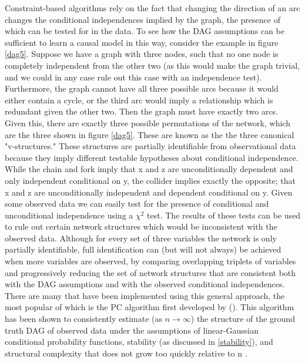 \documentclass{article}
\begin{document}
Constraint-based algorithms rely on the fact that changing the direction of an arc changes the conditional independences implied by the graph, the presence of which can be tested for in the data. To see how the DAG assumptions can be sufficient to learn a causal model in this way, consider the example in figure \ref{dag5}. Suppose we have a graph with three nodes, such that no one node is completely independent from the other two (as this would make the graph trivial, and we could in any case rule out this case with an independence test). Furthermore, the graph cannot have all three possible arcs because it would either contain a cycle, or the third arc would imply a relationship which is redundant given the other two. Then the graph must have exactly two arcs. Given this, there are exactly three possible permutations of the network, which are the three shown in figure \ref{dag5}. These are known as the the three canonical "v-structures." \parencite{pearl2014probabilistic} These structures are partially identifiable from observational data because they imply different testable hypotheses about conditional independence. While the chain and fork imply that x and z are unconditionally dependent and only independent conditional on y, the collider implies exactly the opposite; that x and z are unconditionally independent and dependent conditional on y. Given some observed data we can easily test for the presence of conditional and unconditional independence using a $\chi^2$ test. The results of these tests can be used to rule out certain network structures which would be inconsistent with the observed data. Although for every set of three variables the network is only partially identifiable, full identification can (but will not always) be achieved when more variables are observed, by comparing overlapping triplets of variables and progressively reducing the set of network structures that are consistent both with the DAG assumptions and with the observed conditional independences. There are many that have been implemented using this general approach, the most popular of which is the PC algorithm first developed by \citeauthor{spirtes2000causation} (\citeyear{spirtes2000causation}). This algorithm has been shown to consistently estimate (as $n \rightarrow \infty$) the structure of the ground truth DAG of observed data under the assumptions of linear-Gaussian conditional probability functions, stability (as discussed in \ref{stability}), and structural complexity that does not grow too quickly relative to n \parencite{kalisch2007estimating}. 
\end{document}
